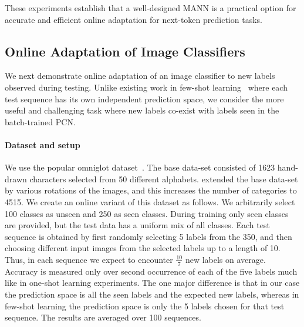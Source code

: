 \documentclass[letterpaper]{article} %
\begin{document}
These experiments establish that a well-designed MANN is a practical option for accurate and efficient online adaptation for next-token prediction tasks.  

\subsection{Online Adaptation of Image Classifiers}
\label{sec-expt-rare}
We next demonstrate online adaptation of an image classifier to new labels observed during testing.  Unlike existing work in few-shot learning~\cite{VinyalsBLKW16} where each test sequence has its own independent prediction space, we consider the more useful and challenging task where new labels co-exist with labels seen in the batch-trained PCN.  

\paragraph*{Dataset and setup} We use the popular omniglot dataset~\cite{Lake1332}. The base data-set consisted of 1623 hand-drawn characters selected from 50 different alphabets.  \cite{VinyalsBLKW16} extended the base data-set by various rotations of the images, and this increases the number of categories to 4515.
 We create an online variant of this dataset as follows. We arbitrarily select 100 classes as unseen and 250 as seen classes. During training only seen classes are provided, but the test data has a uniform mix of all classes. Each test sequence is obtained by first randomly selecting 5 labels from the 350, and then choosing different input images from the selected labels up to a length of 10.
Thus, in each sequence we expect to encounter $\frac{10}{7}$ new labels on average.   Accuracy is measured only over second occurrence of each of the five labels much like in one-shot learning experiments. The one major difference is that in our case the prediction space is all the seen labels and the expected new labels, whereas in few-shot learning the prediction space is only the 5 labels chosen for that test sequence. The results are averaged over 100 sequences. 
\end{document}
